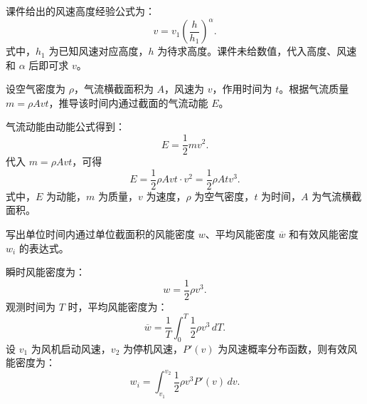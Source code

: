 \begin{solution}
课件给出的风速高度经验公式为：
\begin{equation}
v = v_1 \left(\frac{h}{h_1}\right)^\alpha.
\end{equation}
式中，\(h_1\) 为已知风速对应高度，\(h\) 为待求高度。课件未给数值，代入高度、风速和 \(\alpha\) 后即可求 \(v\)。
\end{solution}

\begin{problem}[气流动能]\label{exer:calc_03_wind_p027_01}
设空气密度为 \(\rho\)，气流横截面积为 \(A\)，风速为 \(v\)，作用时间为 \(t\)。根据气流质量 \(m = \rho A v t\)，推导该时间内通过截面的气流动能 \(E\)。
\end{problem}

\begin{solution}
气流动能由动能公式得到：
\begin{equation}
E = \frac{1}{2}mv^2.
\end{equation}
代入 \(m = \rho A v t\)，可得
\begin{equation}
E = \frac{1}{2}\rho A v t \cdot v^2
  = \frac{1}{2}\rho A t v^3.
\end{equation}
式中，\(E\) 为动能，\(m\) 为质量，\(v\) 为速度，\(\rho\) 为空气密度，\(t\) 为时间，\(A\) 为气流横截面积。
\end{solution}

\begin{problem}[风能密度]\label{exer:calc_03_wind_p028_01}
写出单位时间内通过单位截面积的风能密度 \(w\)、平均风能密度 \(\overline{w}\) 和有效风能密度 \(w_i\) 的表达式。
\end{problem}

\begin{solution}
瞬时风能密度为：
\begin{equation}
w = \frac{1}{2}\rho v^3.
\end{equation}
观测时间为 \(T\) 时，平均风能密度为：
\begin{equation}
\overline{w}
= \frac{1}{T}\int_0^T \frac{1}{2}\rho v^3\,dT.
\end{equation}
设 \(v_1\) 为风机启动风速，\(v_2\) 为停机风速，\(P'(v)\) 为风速概率分布函数，则有效风能密度为：
\begin{equation}
w_i
= \int_{v_1}^{v_2}\frac{1}{2}\rho v^3 P'(v)\,dv.
\end{equation}
\end{solution}

